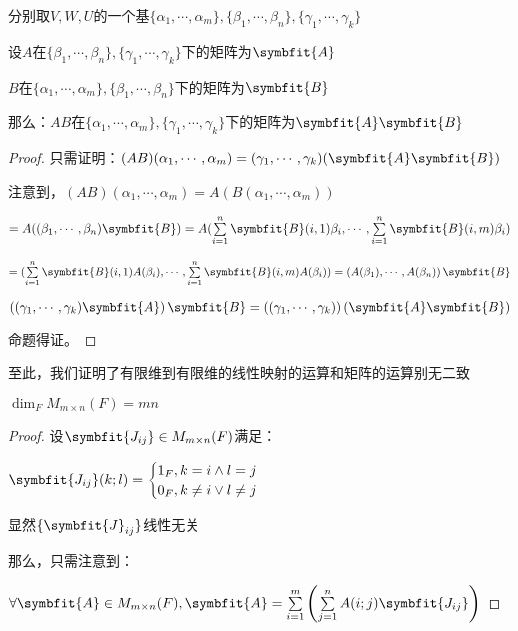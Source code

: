 \documentclass[12pt, a4paper, oneside, UTF8]{ctexbook}
\begin{document}
\begin{para}{0}
\begin{proposition}
						分别取$V,W,U$的一个基$\{\alpha_1,\cdots,\alpha_m\},\{\beta_1,\cdots,\beta_n\},\{\gamma_1,\cdots,\gamma_k\}$

						设$A$在$\{\beta_1,\cdots,\beta_n\},\{\gamma_1,\cdots,\gamma_k\}$下的矩阵为$\symbfit{A}$
						
						$B$在$\{\alpha_1,\cdots,\alpha_m\},\{\beta_1,\cdots,\beta_n\}$下的矩阵为$\symbfit{B}$

						那么：$AB$在$\{\alpha_1,\cdots,\alpha_m\},\{\gamma_1,\cdots,\gamma_k\}$下的矩阵为$\symbfit{A}\symbfit{B}$
					\end{proposition}
					\begin{proof}
						只需证明：$(AB)(\alpha_1,\cdots,\alpha_m)=(\gamma_1,\cdots,\gamma_k)(\symbfit{A}\symbfit{B})$
					
						注意到，$(AB)(\alpha_1,\cdots,\alpha_m)=A\left(B(\alpha_1,\cdots,\alpha_m)\right)$

						$=A((\beta_1,\cdots,\beta_n)\symbfit{B})=A(\sum\limits_{i=1}^{n}\symbfit{B}(i,1)\beta_i,\cdots,\sum\limits_{i=1}^{n}\symbfit{B}(i,m)\beta_i)$

						$=(\sum\limits_{i=1}^{n}\symbfit{B}(i,1)A(\beta_i),\cdots,\sum\limits_{i=1}^{n}\symbfit{B}(i,m)A(\beta_i))=\left(A(\beta_1),\cdots,A(\beta_n)\right)\symbfit{B}$

						$\left((\gamma_1,\cdots,\gamma_k)\symbfit{A}\right)\symbfit{B}=\left((\gamma_1,\cdots,\gamma_k)\right)(\symbfit{A}\symbfit{B})$
						
						命题得证。
					\end{proof}
					至此，我们证明了有限维到有限维的线性映射的运算和矩阵的运算别无二致
				\point{}
					\begin{proposition}
						$\dim_F M_{m \times n}(F) = mn$
					\end{proposition}
					\begin{proof}
						设$\symbfit{J_{ij}} \in M_{m \times n}(F)$满足：

						$\symbfit{J_{ij}}(k;l)=\begin{cases}
							1_F,k=i \wedge l=j \\
							0_F,k \neq i \vee l \neq j
						\end{cases}$

						显然$\{\symbfit{J}_{ij}\}$线性无关

						那么，只需注意到：

						$\forall \symbfit{A} \in M_{m \times n}(F),\symbfit{A} = \sum\limits_{i=1}^{m}\left(\sum\limits_{j=1}^{n}A(i;j)\symbfit{J_{ij}}\right)$
					

\end{proof}
\end{para}
\end{document}
